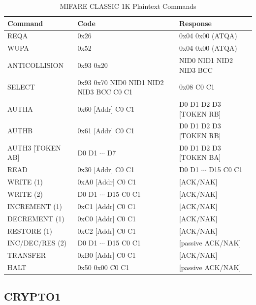 \documentclass[fleqn,10pt]{SelfArx} %
\begin{document}
\begin{table}[ht]
\centering
\caption{MIFARE CLASSIC 1K Plaintext Commands}
\label{tab:cmd1k}
\begin{tabular}{|l|l|l|}
\hline
\rowcolor[HTML]{E2F1F3} 
{\bf Command} 		&     {\bf Code} 						&    {\bf Response} 		\\ \hline
REQA 				&     0x26      						&    0x04  0x00 (ATQA) 		\\ \hline
WUPA 			&     0x52      						&    0x04  0x00 (ATQA) 		\\ \hline
ANTICOLLISION	  	&     0x93 0x20     						&    NID0 NID1 NID2 NID3 BCC   	\\ \hline
SELECT  			&     0x93 0x70  NID0 NID1 NID2 NID3 BCC C0 C1  	&    0x08 C0 C1			\\ \hline
AUTHA			&     0x60 [Addr] C0 C1					&    D0 D1 D2 D3  [TOKEN RB]    	\\ \hline
AUTHB			&     0x61 [Addr] C0 C1					&    D0 D1 D2 D3  [TOKEN RB]	\\ \hline
AUTH3 [TOKEN AB]		&     D0 D1 $\cdots$ D7					&    D0 D1 D2 D3  [TOKEN BA]	\\ \hline
READ 				&     0x30 [Addr] C0 C1					&    D0 D1 $\cdots$ D15 C0 C1    	\\ \hline
WRITE (1)			&     0xA0 [Addr] C0 C1 					&   [ACK/NAK]			\\ \hline
WRITE (2)			&     D0 D1 $\cdots$ D15 C0 C1				&   [ACK/NAK]			\\ \hline
INCREMENT (1)		&     0xC1 [Addr] C0 C1					&   [ACK/NAK]			\\ \hline
DECREMENT (1)		&     0xC0 [Addr] C0 C1					&   [ACK/NAK]			\\ \hline
RESTORE (1)			&     0xC2 [Addr] C0 C1					&   [ACK/NAK]			\\ \hline
INC/DEC/RES (2)		&     D0 D1 $\cdots$ D15 C0 C1				&   [passive ACK/NAK]		\\ \hline
TRANSFER			&     0xB0 [Addr] C0 C1					&   [ACK/NAK]			\\ \hline
HALT				&     0x50 0x00 C0 C1				       	&   [passive ACK/NAK]             	\\ \hline
\end{tabular}
\end{table}

\newpage
\subsection{CRYPTO1}
\label{app:crypto1}
\end{document}
